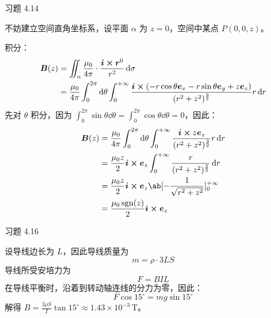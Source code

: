 \begin{problem}
	习题 4.14
	\begin{solution}
		不妨建立空间直角坐标系，设平面 $\alpha$ 为 $z = 0$，空间中某点 $P(0, 0, z)$。

		积分：
		$$
		\begin{aligned}
			\vect{B}(z) & = \iint_{\alpha} \frac{\mu_0}{4 \pi} \cdot \frac{\vect{i} \cp \vect{r}^0}{r^2} \dd{\sigma} \\
			& = \frac{\mu_0}{4 \pi} \int_{0}^{2\pi} \dd{\theta} \int_{0}^{+\infty} \frac{\vect{i} \cp (-r \cos \theta \vect{e}_x - r \sin \theta \vect{e}_y + z \vect{e}_z)}{(r^2 + z^2)^{\frac{3}{2}}} r \dd{r}
		\end{aligned}
		$$
		先对 $\theta$ 积分，因为 $\displaystyle \int_{0}^{2\pi} \sin \theta \dd{\theta} = \int_{0}^{2\pi} \cos \theta \dd{\theta} = 0$，因此：
		$$
		\begin{aligned}
			\vect{B}(z) & = \frac{\mu_0}{4 \pi} \int_{0}^{2\pi} \dd{\theta} \int_{0}^{+\infty} \frac{\vect{i} \cp z \vect{e}_z}{(r^2 + z^2)^{\frac{3}{2}}} r \dd{r} \\
			& = \frac{\mu_0 z}{2} \vect{i} \cp \vect{e}_z \int_{0}^{+\infty} \frac{r}{(r^2 + z^2)^{\frac{3}{2}}} \dd{r} \\
			& = \frac{\mu_0 z}{2} \vect{i} \cp \vect{e}_z \ab[-\frac{1}{\sqrt{r^2 + z^2}}]_{0}^{+\infty} \\
			& = \frac{\mu_0 \sgn(z)}{2} \vect{i} \cp \vect{e}_z
		\end{aligned}
		$$
	\end{solution}
\end{problem}

\begin{problem}
	习题 4.16
	\begin{solution}
		设导线边长为 $L$，因此导线质量为
		$$
		m = \rho \cdot 3 L S
		$$
		导线所受安培力为
		$$
		F = B I L
		$$
		在导线平衡时，沿着到转动轴连线的分力为零，因此：
		$$
		F \cos 15^{\circ} = m g \sin 15^{\circ}
		$$
		解得 $B = \frac{3 \rho S}{I} \tan 15^{\circ} \approx 1.43 \times 10^{-3} \,\mathrm{T}$。
	\end{solution}
\end{problem}

